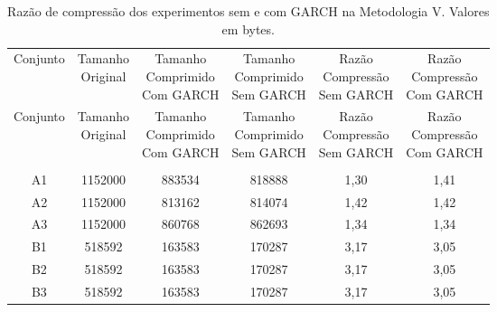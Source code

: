 \begin{center}
\begin{longtable}{cccccc}
\toprule
\rowcolor{white}
\caption[Metodologia V: Razão de compressão]{Razão de compressão dos
experimentos sem e com GARCH na Metodologia V.
Valores em bytes.} \label{Tab:razaocompressaoMet5} \\
\midrule
Conjunto & \specialcell{Tamanho \\Original} & \specialcell{Tamanho
\\Comprimido\\Com GARCH} & \specialcell{Tamanho
\\Comprimido\\Sem GARCH} & \specialcell{Razão \\Compressão
\\Sem GARCH} & \specialcell{Razão \\Compressão
\\Com GARCH} \\
\midrule
\endfirsthead
\midrule
\rowcolor{white}
Conjunto & \specialcell{Tamanho \\Original} & \specialcell{Tamanho
\\Comprimido\\Com GARCH} & \specialcell{Tamanho
\\Comprimido\\Sem GARCH} & \specialcell{Razão \\Compressão
\\Sem GARCH} & \specialcell{Razão \\Compressão
\\Com GARCH} \\
\toprule
\endhead
\midrule \\ %
\endfoot
\bottomrule
\endlastfoot
    A1    & 1152000 & 883534 & 818888 & 1,30  & 1,41 \\
    A2    & 1152000 & 813162 & 814074 & 1,42  & 1,42 \\
    A3    & 1152000 & 860768 & 862693 & 1,34  & 1,34 \\
    B1    & 518592 & 163583 & 170287 & 3,17  & 3,05 \\
    B2    & 518592 & 163583 & 170287 & 3,17  & 3,05 \\
    B3    & 518592 & 163583 & 170287 & 3,17  & 3,05 \\

\end{longtable}
\end{center}
